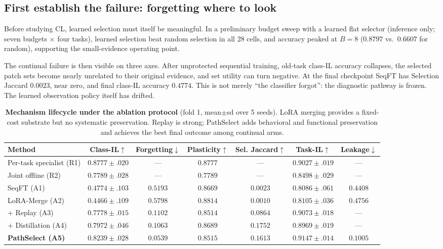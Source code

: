 \documentclass{article}
\begin{document}
\subsection{First establish the failure: forgetting where to look}

Before studying CL, learned selection must itself be meaningful.
In a preliminary budget sweep with a learned flat selector (inference only; seven budgets $\times$ four tasks), learned selection beat random selection in all 28 cells, and accuracy peaked at $B=8$ ($0.8797$ vs.\ $0.6607$ for random), supporting the small-evidence operating point.

The continual failure is then visible on three axes.
After unprotected sequential training, old-task class-IL accuracy collapses, the selected patch sets become nearly unrelated to their original evidence, and set utility can turn negative.
At the final checkpoint SeqFT has Selection Jaccard $0.0023$, near zero, and final class-IL accuracy $0.4774$.
This is not merely ``the classifier forgot'': the diagnostic pathway is frozen.
The learned observation policy itself has drifted.

\begin{table}[t]
\centering
\footnotesize
\caption{\textbf{Mechanism lifecycle under the ablation protocol} (fold 1, mean$\pm$sd over 5 seeds).
LoRA merging provides a fixed-cost substrate but no systematic preservation.
Replay is strong; PathSelect adds behavioral and functional preservation and achieves the best final outcome among continual arms.}
\label{tab:main}
\begin{tabular}{lcccccc}
\toprule
Method &
Class-IL$\uparrow$ &
Forgetting$\downarrow$ &
Plasticity$\uparrow$ &
Sel. Jaccard$\uparrow$ &
Task-IL$\uparrow$ &
Leakage$\downarrow$ \\
\midrule
Per-task specialist (R1) & $0.8777{\pm}.020$ & --- & $0.8777$ & --- & $0.9027{\pm}.019$ & --- \\
Joint offline (R2)       & $0.7789{\pm}.028$ & --- & $0.7789$ & --- & $0.8498{\pm}.029$ & --- \\
\midrule
SeqFT (A1)               & $0.4774{\pm}.103$ & $0.5193$ & $0.8669$ & $0.0023$ & $0.8086{\pm}.061$ & $0.4408$ \\
LoRA-Merge (A2)          & $0.4466{\pm}.109$ & $0.5798$ & $0.8814$ & $0.0010$ & $0.8105{\pm}.036$ & $0.4756$ \\
$+$ Replay (A3)          & $0.7778{\pm}.015$ & $0.1102$ & $0.8514$ & $0.0864$ & $0.9073{\pm}.018$ & --- \\
$+$ Distillation (A4)    & $0.7972{\pm}.046$ & $0.1063$ & $0.8689$ & $\mathbf{0.1752}$ & $0.8969{\pm}.019$ & --- \\
\textbf{PathSelect (A5)} & $\mathbf{0.8239{\pm}.028}$ & $\mathbf{0.0539}$ & $0.8515$ & $0.1613$ & $\mathbf{0.9147{\pm}.014}$ & $\mathbf{0.1005}$ \\
\bottomrule
\end{tabular}
\end{table}
\end{document}

